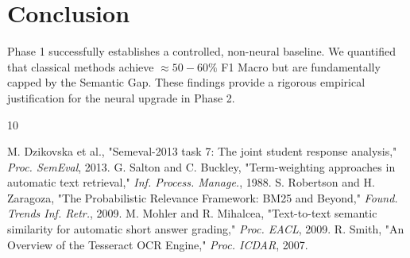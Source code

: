 \documentclass[conference]{IEEEtran}
\begin{document}
\section{Conclusion}
Phase 1 successfully establishes a controlled, non-neural baseline. We quantified that classical methods achieve $\approx 50-60\%$ F1 Macro but are fundamentally capped by the Semantic Gap. These findings provide a rigorous empirical justification for the neural upgrade in Phase 2.


\begin{thebibliography}{10}

 M. Dzikovska et al., "Semeval-2013 task 7: The joint student response analysis," \textit{Proc. SemEval}, 2013.
 G. Salton and C. Buckley, "Term-weighting approaches in automatic text retrieval," \textit{Inf. Process. Manage.}, 1988.
 S. Robertson and H. Zaragoza, "The Probabilistic Relevance Framework: BM25 and Beyond," \textit{Found. Trends Inf. Retr.}, 2009.
 M. Mohler and R. Mihalcea, "Text-to-text semantic similarity for automatic short answer grading," \textit{Proc. EACL}, 2009.
 R. Smith, "An Overview of the Tesseract OCR Engine," \textit{Proc. ICDAR}, 2007.

\end{thebibliography}
\end{document}
